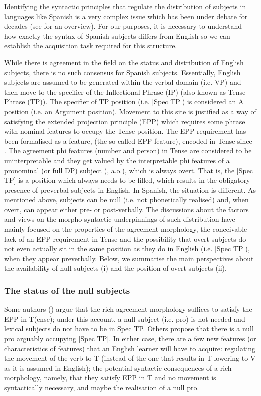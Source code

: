 \documentclass[output=paper]{langscibook}
\begin{document}
Identifying the syntactic principles that regulate the distribution of subjects in languages like Spanish is a very complex issue which has been under debate for decades (see \citealt{Sheehan2016} for an overview). For our purposes, it is necessary to understand how exactly the syntax of Spanish subjects differs from English so we can establish the acquisition task required for this structure.

While there is agreement in the field on the status and distribution of English subjects, there is no such consensus for Spanish subjects. Essentially, English subjects are assumed to be generated within the verbal domain (i.e. VP) and then move to the specifier of the Inflectional Phrase (IP) (also known as Tense Phrase (TP)). The specifier of TP position (i.e. [Spec TP]) is considered an A position (i.e. an Argument position). Movement to this site is justified as a way of satisfying the extended projection principle (EPP) which requires some phrase with nominal features to occupy the Tense position. The EPP requirement has been formalised as a feature, (the so-called EPP feature), encoded in Tense since \citealt{Chomsky1995}. The agreement phi features (number and person) in Tense are considered to be uninterpretable and they get valued by the interpretable phi features of a pronominal (or full DP) subject (\citealt{Chomsky1995,Chomsky2000,Holmberg2005, Sheehan2016, Roberts2010}, a.o.), which is always overt. That is, the [Spec TP] is a position which always needs to be filled, which results in the obligatory presence of preverbal subjects in English. In Spanish, the situation is different. As mentioned above, subjects can be null (i.e. not phonetically realised) and, when overt, can appear either pre- or post-verbally. The discussions about the factors and views on the morpho-syntactic underpinnings of such distribution have mainly focused on the properties of the agreement morphology, the conceivable lack of an EPP requirement in Tense and the possibility that overt subjects do not even actually sit in the same position as they do in English (i.e. [Spec TP]), when they appear preverbally. Below, we summarise the main perspectives about the availability of null subjects (i) and the position of overt subjects (ii).

\subsubsection{The status of the null subjects}
Some authors (\citealt{Barbosa1995,Barbosa2009,AlexiadouAnagnostopoulou1998}) argue that the rich agreement morphology suffices to satisfy the EPP in T(ense); under this account, a null subject (i.e. pro) is not needed and lexical subjects do not have to be in Spec TP. Others propose that there is a null pro arguably occupying [Spec TP]. In either case, there are a few new features (or characteristics of features) that an English learner will have to acquire: regulating the movement of the verb to T (instead of the one that results in T lowering to V as it is assumed in English); the potential syntactic consequences of a rich morphology, namely, that they satisfy EPP in T and no movement is syntactically necessary, and maybe the realisation of a null pro.
\end{document}
